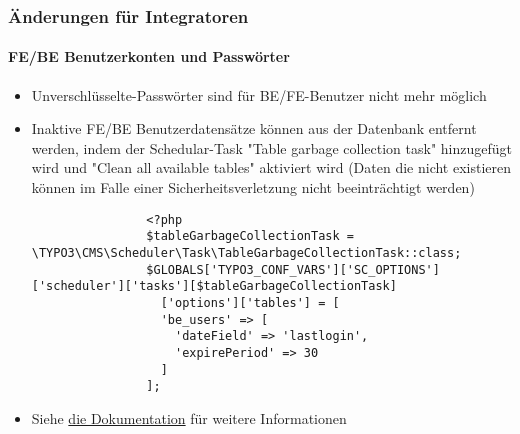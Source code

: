 \begin{frame}[fragile]
	\frametitle{Änderungen für Integratoren}
	\framesubtitle{FE/BE Benutzerkonten und Passwörter}

	\lstset{basicstyle=\tiny\ttfamily}

	\begin{itemize}
		\item Unverschlüsselte-Passwörter sind für BE/FE-Benutzer nicht mehr möglich
		\item Inaktive FE/BE Benutzerdatensätze können aus der Datenbank entfernt werden, indem der Schedular-Task
			"Table garbage collection task" hinzugefügt wird und "Clean all available tables"
			aktiviert wird\newline
			\smaller
				(Daten die nicht existieren können im Falle einer Sicherheitsverletzung nicht
				beeinträchtigt werden)
			\normalsize

			\begin{lstlisting}
				<?php
				$tableGarbageCollectionTask = \TYPO3\CMS\Scheduler\Task\TableGarbageCollectionTask::class;
				$GLOBALS['TYPO3_CONF_VARS']['SC_OPTIONS']['scheduler']['tasks'][$tableGarbageCollectionTask]
				  ['options']['tables'] = [
				  'be_users' => [
				    'dateField' => 'lastlogin',
				    'expirePeriod' => 30
				  ]
				];
			\end{lstlisting}

		\item Siehe \href{https://docs.typo3.org/typo3cms/extensions/scheduler/Installation/BaseTasks/Index.html}{die Dokumentation} für weitere Informationen
	\end{itemize}
\end{frame}


